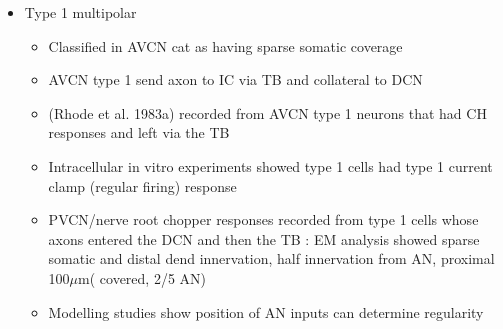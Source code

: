 \documentclass[10pt,a4paper]{article}
\newcommand{\um}{$\mu$m}
\begin{document}
\begin{itemize}
\item Type 1 multipolar

  \begin{itemize}
  \item Classified in AVCN cat as having sparse somatic coverage
    \citep{Cant:1981}
  \item AVCN type 1 send axon to IC \citep{Adams:1979,Cant:1982} via TB
    \citep{TolbertMorestEtAl:1982} and collateral to DCN \citep{Adams:1983b}
  \item (Rhode et al. 1983a) recorded from AVCN type 1 neurons that had CH
    responses and left via the TB
  \item Intracellular in vitro experiments showed type 1 cells had type 1
    current clamp (regular firing) response \citep{WuOertel:1984}
  \item PVCN/nerve root chopper responses recorded from type 1 cells whose axons
    entered the DCN and then the TB \citep{SmithRhode:1989}: EM analysis showed
    sparse somatic and distal dend innervation, half innervation from AN,
    proximal 100\um ( {\textonehalf} covered, 2/5 AN)
  \item Modelling studies show position of AN inputs can determine regularity
    \citep{BanksSachs:1991}
  \end{itemize}
\end{itemize}

\subsection{\citep{OertelFujino:2001}}
\end{document}
